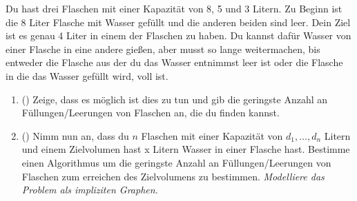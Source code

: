 \documentclass{uebung_cs}
\begin{document}
\begin{aufgabe}
Du hast drei Flaschen mit einer Kapazität von 8, 5 und 3 Litern.
Zu Beginn ist die 8 Liter Flasche mit Wasser gefüllt und die anderen beiden sind leer.
Dein Ziel ist es genau 4 Liter in einem der Flaschen zu haben. Du kannst dafür Wasser von einer Flasche in eine andere gießen, aber musst so lange weitermachen, bis entweder die Flasche aus der du das Wasser entnimmst leer ist oder die Flasche in die das Wasser gefüllt wird, voll ist.
\begin{enumerate}
	\item (\hard) Zeige, dass es möglich ist dies zu tun und gib die geringste Anzahl an Füllungen/Leerungen von Flaschen an, die du finden kannst.
	\item (\hard) Nimm nun an, dass du $n$ Flaschen mit einer Kapazität von $d_1, \ldots, d_n$ Litern und einem Zielvolumen hast x Litern Wasser in einer Flasche hast.
	Bestimme einen Algorithmus um die geringste Anzahl an Füllungen/Leerungen von Flaschen zum erreichen des Zielvolumens zu bestimmen.
	\textit{Modelliere das Problem als impliziten Graphen.}
\end{enumerate}
\end{aufgabe}
\end{document}
